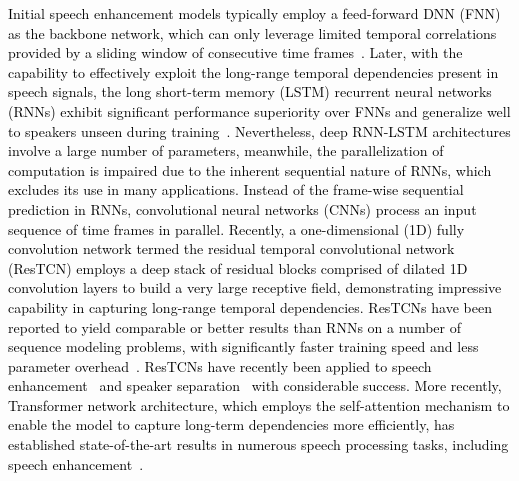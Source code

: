 \documentclass[journal]{IEEEtran}
\begin{document}
\textcolor{black}{
Initial speech enhancement models typically employ a feed-forward DNN (FNN) as the backbone network, which can only leverage limited temporal correlations provided by a sliding window of consecutive time frames~\cite{yongxu2015,targets,cirm}. Later, with the capability to effectively exploit the long-range temporal dependencies present in speech signals, the long short-term memory (LSTM) recurrent neural networks (RNNs) exhibit significant performance superiority over FNNs and generalize well to speakers unseen during training~\cite{2014lstm,2015lstm,chenlstm}. Nevertheless, deep RNN-LSTM architectures involve a large number of parameters, meanwhile, the parallelization of computation is impaired due to the inherent sequential nature of RNNs, which excludes its use in many applications. Instead of the frame-wise sequential prediction in RNNs, convolutional neural networks (CNNs) process an input sequence of time frames in parallel. Recently, a one-dimensional (1D) fully convolution network termed the residual temporal convolutional network (ResTCN) employs a deep stack of residual blocks comprised of dilated 1D convolution layers to build a very large receptive field, demonstrating impressive capability in capturing long-range temporal dependencies. ResTCNs have been reported to yield comparable or better results than RNNs on a number of sequence modeling problems, with significantly faster training speed and less parameter overhead~\cite{TCN2018}. ResTCNs have recently been applied to speech enhancement~\cite{GRN,DeepMMSE,tfa} and speaker separation~\cite{zhiqiang2019,convtasnet} with considerable success. More recently, Transformer network architecture, which employs the self-attention mechanism to enable the model to capture long-term dependencies more efficiently, has established state-of-the-art results in numerous speech processing tasks, including speech enhancement~\cite{tgsa,tfaj,conformer-se,dang2022dpt,yu2022dual}.}


\end{document}
